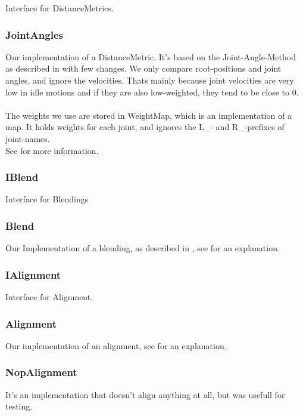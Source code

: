 \documentclass[a4paper,10pt,titlepage,bibliography=totocnumbered]{scrartcl}
\begin{document}
Interface for DistanceMetrics.

\subsubsection{JointAngles}
\label{sec:jointangles}
Our implementation of a DistanceMetric. It's based on the Joint-Angle-Method as described in \cite[4.1 Joint angles]{vanbasten2009} with few changes.
We only compare root-positions and joint angles, and ignore the velocities. Thats mainly because joint velocities are very low in idle motions and if they are also low-weighted, they tend to be close to 0.
\\\\
The weights we use are stored in WeightMap, which is an implementation of a map. It holds weights for each joint, and ignores the L\_- and R\_-prefixes of joint-names.
\\
See  for more information.

\subsubsection{IBlend}

Interface for Blendings

\subsubsection{Blend}

Our Implementation of a blending, as described in \cite[3.3 Creating Transitions]{kovar2012}, see   for an explanation.

\subsubsection{IAlignment}

Interface for Alignment.

\subsubsection{Alignment}

Our implementation of an alignment, see  for an explanation.

\subsubsection{NopAlignment}

It's an implementation that doesn't align anything at all, but was usefull for testing.
\end{document}
